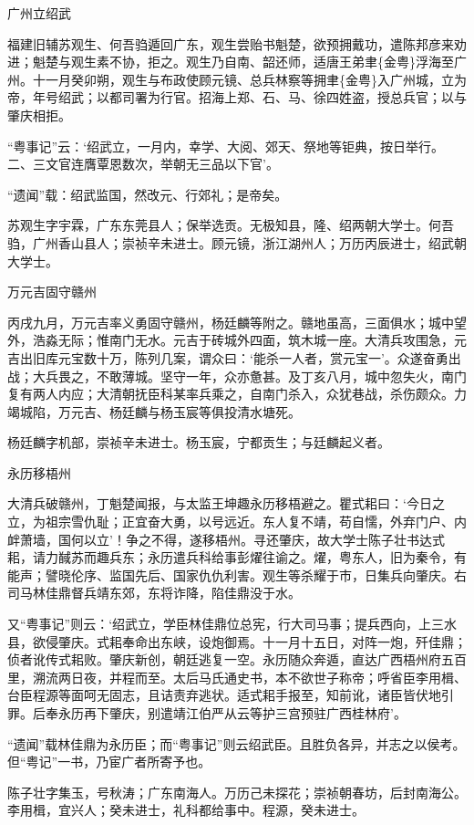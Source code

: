 \documentclass[]{article}
\begin{document}
广州立绍武

福建旧辅苏观生、何吾驺遁回广东，观生尝贻书魁楚，欲预拥戴功，遣陈邦彦来劝进；魁楚与观生素不协，拒之。观生乃自南、韶还师，适唐王弟聿\{金粤\}浮海至广州。十一月癸卯朔，观生与布政使顾元镜、总兵林察等拥聿\{金粤\}入广州城，立为帝，年号绍武；以都司署为行官。招海上郑、石、马、徐四姓盗，授总兵官；以与肇庆相拒。

``粤事记''云：`绍武立，一月内，幸学、大阅、郊天、祭地等钜典，按日举行。二、三文官连膺覃恩数次，举朝无三品以下官'。

``遗闻''载：绍武监国，然改元、行郊礼；是帝矣。

苏观生字宇霖，广东东莞县人；保举选贡。无极知县，隆、绍两朝大学士。何吾驺，广州香山县人；崇祯辛未进士。顾元镜，浙江湖州人；万历丙辰进士，绍武朝大学士。

万元吉固守赣州

丙戌九月，万元吉率义勇固守赣州，杨廷麟等附之。赣地虽高，三面俱水；城中望外，浩淼无际；惟南门无水。元吉于砖城外四面，筑木城一座。大清兵攻围急，元吉出旧库元宝数十万，陈列几案，谓众曰：`能杀一人者，赏元宝一'。众遂奋勇出战；大兵畏之，不敢薄城。坚守一年，众亦惫甚。及丁亥八月，城中忽失火，南门复有两人内应；大清朝抚臣科某率兵乘之，自南门杀入，众犹巷战，杀伤颇众。力竭城陷，万元吉、杨廷麟与杨玉宸等俱投清水塘死。

杨廷麟字机部，崇祯辛未进士。杨玉宸，宁都贡生；与廷麟起义者。

永历移梧州

大清兵破赣州，丁魁楚闻报，与太监王坤趣永历移梧避之。瞿式耜曰：`今日之立，为祖宗雪仇耻；正宜奋大勇，以号远近。东人复不靖，苟自懦，外弃门户、内衅萧墙，国何以立'！争之不得，遂移梧州。寻还肇庆，故大学士陈子壮书达式耜，请力馘苏而趣兵东；永历遣兵科给事彭燿往谕之。燿，粤东人，旧为秦令，有能声；譬晓伦序、监国先后、国家仇仇利害。观生等杀耀于市，日集兵向肇庆。右司马林佳鼎督兵靖东郊，东将诈降，陷佳鼎没于水。

又``粤事记''则云：`绍武立，学臣林佳鼎位总宪，行大司马事；提兵西向，上三水县，欲侵肇庆。式耜奉命出东峡，设炮御焉。十一月十五日，对阵一炮，歼佳鼎；侦者讹传式耜败。肇庆新创，朝廷逃复一空。永历随众奔遁，直达广西梧州府五百里，溯流两日夜，并程而至。太后马氏通史书，本不欲世子称帝；呼省臣李用楫、台臣程源等面呵无固志，且诘责弃逃状。适式耜手报至，知前讹，诸臣皆伏地引罪。后奉永历再下肇庆，别遣靖江伯严从云等护三宫预驻广西桂林府'。

``遗闻''载林佳鼎为永历臣；而``粤事记''则云绍武臣。且胜负各异，并志之以侯考。但``粤记''一书，乃宦广者所寄予也。

陈子壮字集玉，号秋涛；广东南海人。万历己未探花；崇祯朝春坊，后封南海公。李用楫，宜兴人；癸未进士，礼科都给事中。程源，癸未进士。
\end{document}
